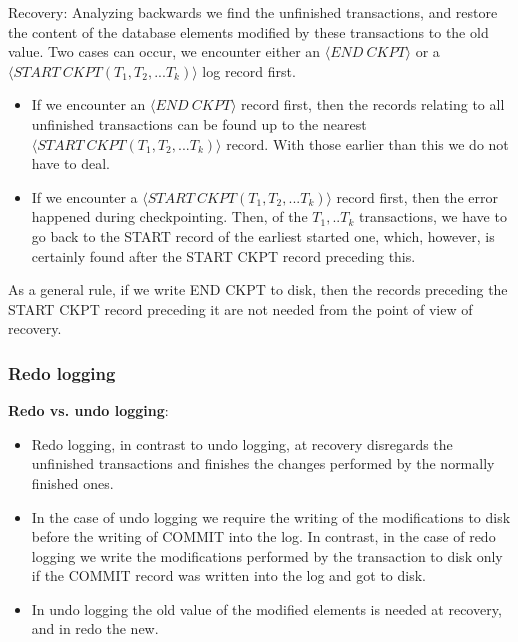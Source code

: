 \documentclass[margin=0px]{article}
\begin{document}
\noindent Recovery: Analyzing backwards we find the unfinished transactions, and restore the content of the database elements
modified by these transactions to the old value. Two cases can occur, we encounter either an $\langle END \ CKPT \rangle$ or a
$\langle START \ CKPT(T_{1},T_{2},...T_{k}) \rangle$ log record first.

\begin{itemize}
    \item	If we encounter an $\langle END \ CKPT \rangle$ record first, then the records relating to all unfinished transactions
          can be found up to the nearest $\langle START \ CKPT(T_{1},T_{2},...T_{k}) \rangle$ record. With those earlier than this
          we do not have to deal.

    \item	If we encounter a $\langle START \ CKPT(T_{1},T_{2},...T_{k}) \rangle$ record first, then the error
          happened during checkpointing. Then, of the $T_{1},..T_{k}$ transactions, we have to go back to the START record of the
          earliest started one, which, however, is certainly found after the START CKPT record preceding this.
\end{itemize}

As a general rule, if we write END CKPT to disk, then the records preceding the START CKPT record preceding it
are not needed from the point of view of recovery.

\subsubsection{Redo logging}

\noindent \textbf{Redo vs. undo logging}:
\begin{itemize}
    \item	Redo logging, in contrast to undo logging, at recovery disregards the unfinished
          transactions and finishes the changes performed by the normally finished ones.

    \item	In the case of undo logging we require the writing of the modifications to disk before the writing of COMMIT into the log. In contrast,
          in the case of redo logging we write the modifications performed by the transaction to disk only if the COMMIT record
          was written into the log and got to disk.

    \item	In undo logging the old value of the modified elements is needed at recovery, and in redo the new.
\end{itemize}
\end{document}
